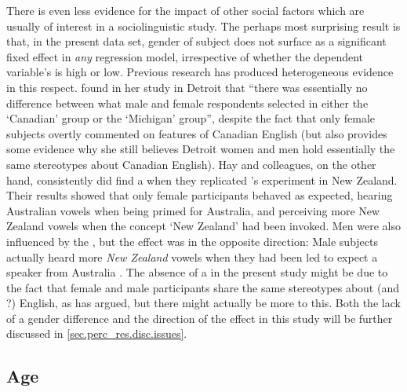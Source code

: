 There is even less evidence for the impact of other social factors which are usually of interest in a sociolinguistic study.
The perhaps most surprising result is that, in the present data set, gender of subject does not surface as a significant fixed effect in \emph{any} regression model, irrespective of whether the dependent variable's  is high or low.
Previous research has produced heterogeneous evidence in this respect.
\textcite[69 and 79--80]{niedzielski1999} found in her study in Detroit that ``there was essentially no difference between what male and female respondents selected in either the `Canadian' group or the `Michigan' group'', despite the fact that only female subjects overtly commented on  features of Canadian English (but \citeauthor{niedzielski1999} also provides some evidence why she still believes Detroit women and men hold essentially the same stereotypes about Canadian English).
Hay and colleagues, on the other hand, consistently did find a  when they replicated \citeauthor{niedzielski1999}'s experiment in New Zealand.
Their results showed that only female participants behaved as expected, hearing Australian vowels when being primed for Australia, and perceiving more New Zealand vowels when the concept `New Zealand' had been invoked.
Men were also influenced by the , but the  effect was in the opposite direction: Male subjects actually heard more \emph{New Zealand} vowels when they had been led to expect a speaker from Australia \parencite{hayetal2006a,haydrager2010}.
The absence of a  in the present study might be due to the fact that female and male participants share the same stereotypes about  (and ?) English, as \citeauthor{niedzielski1999} has argued, but there might actually be more to this.
Both the lack of a gender difference and the direction of the  effect in this study will be further discussed in \ref{sec.perc_res.disc.issues}.

		\subsection{Age}

